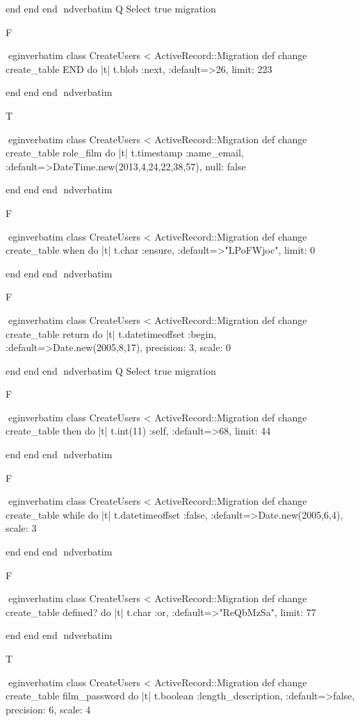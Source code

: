     end 
  end 
end
nd{verbatim}
Q
 Select true migration

F

egin{verbatim}
 class CreateUsers < ActiveRecord::Migration 
  def change 
    create_table END do |t| 
      t.blob :next, :default=>26, limit: 223
    
    end 
  end 
end
nd{verbatim}

T

egin{verbatim}
 class CreateUsers < ActiveRecord::Migration 
  def change 
    create_table role_film do |t| 
      t.timestamp :name_email, :default=>DateTime.new(2013,4,24,22,38,57), null: false
    
    end 
  end 
end
nd{verbatim}

F

egin{verbatim}
 class CreateUsers < ActiveRecord::Migration 
  def change 
    create_table when do |t| 
      t.char :ensure, :default=>"LPoFWjoc", limit: 0
    
    end 
  end 
end
nd{verbatim}

F

egin{verbatim}
 class CreateUsers < ActiveRecord::Migration 
  def change 
    create_table return do |t| 
      t.datetimeoffset :begin, :default=>Date.new(2005,8,17), precision: 3, scale: 0
    
    end 
  end 
end
nd{verbatim}
Q
 Select true migration

F

egin{verbatim}
 class CreateUsers < ActiveRecord::Migration 
  def change 
    create_table then do |t| 
      t.int(11) :self, :default=>68, limit: 44
    
    end 
  end 
end
nd{verbatim}

F

egin{verbatim}
 class CreateUsers < ActiveRecord::Migration 
  def change 
    create_table while do |t| 
      t.datetimeoffset :false, :default=>Date.new(2005,6,4), scale: 3
    
    end 
  end 
end
nd{verbatim}

F

egin{verbatim}
 class CreateUsers < ActiveRecord::Migration 
  def change 
    create_table defined? do |t| 
      t.char :or, :default=>"ReQbMzSa", limit: 77
    
    end 
  end 
end
nd{verbatim}

T

egin{verbatim}
 class CreateUsers < ActiveRecord::Migration 
  def change 
    create_table film_password do |t| 
      t.boolean :length_description, :default=>false, precision: 6, scale: 4
    
